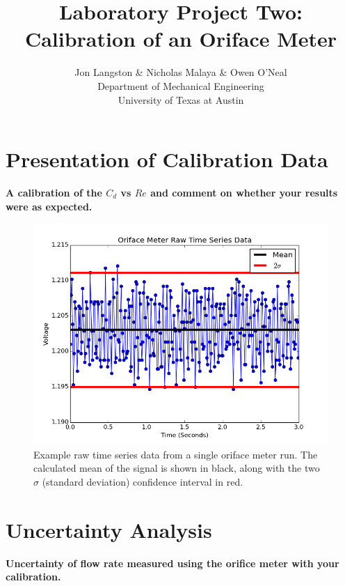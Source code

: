 \documentclass{article}
\title{\bf{Laboratory Project Two: Calibration of an Oriface Meter}}
\author{Jon Langston \& Nicholas Malaya \& Owen O'Neal \\ Department of Mechanical Engineering \\ University of Texas at Austin} \date{}
\begin{document}
\maketitle
\date{}
\newpage
\section{Presentation of Calibration Data}

\textbf{A calibration of the $C_d$ vs $Re$ and comment on whether your results were as expected.}  

\begin{figure}[!htb]
  \begin{center}
    \includegraphics[width = 12 cm]{figs/oriface_time.png}
    \caption{Example raw time series data from a single oriface meter 
      run. The calculated mean of the signal is shown in black, along with
      the two $\sigma$ (standard deviation) confidence interval in
      red.}
    \label{oriface-time}
  \end{center}
\end{figure}

\newpage
\section{Uncertainty Analysis}

\textbf{Uncertainty of flow rate measured using the orifice meter with your calibration.}
\end{document}
